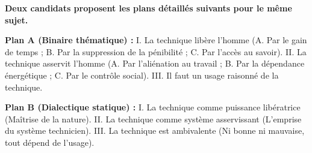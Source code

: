 \documentclass[11pt]{article}
\begin{document}
\begin{exercice}
\textbf{Deux candidats proposent les plans détaillés suivants pour le même sujet.}

\textbf{Plan A (Binaire thématique) :}
I. La technique libère l'homme (A. Par le gain de temps ; B. Par la suppression de la pénibilité ; C. Par l'accès au savoir).
II. La technique asservit l'homme (A. Par l'aliénation au travail ; B. Par la dépendance énergétique ; C. Par le contrôle social).
III. Il faut un usage raisonné de la technique.

\textbf{Plan B (Dialectique statique) :}
I. La technique comme puissance libératrice (Maîtrise de la nature).
II. La technique comme système asservissant (L'emprise du système technicien).
III. La technique est ambivalente (Ni bonne ni mauvaise, tout dépend de l'usage).


\end{exercice}
\end{document}
